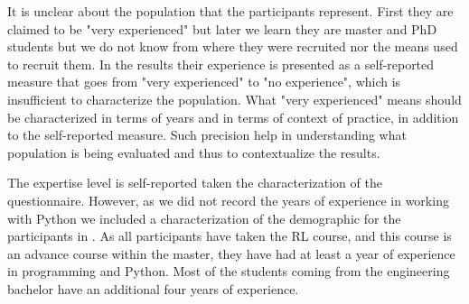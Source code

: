\begin{remark} \label{rem:characterization}
It is unclear about the population that the participants represent. First they are claimed to be "very experienced" but later we learn they are master and PhD students but we do not know from where they were recruited nor the means used to recruit them. In the results their experience is presented as a self-reported measure that goes from "very experienced" to "no experience", which is insufficient to characterize the population. What "very experienced" means should be characterized in terms of years and in terms of context of practice, in addition to the self-reported measure. Such precision help in understanding what population is being evaluated and thus to contextualize the results.
\end{remark}
\begin{solved}
The expertise level is self-reported taken the characterization of the questionnaire. However, as we did not record the years of experience in working with Python we included a characterization of the  demographic for the participants in . As all participants have taken the \ac{RL} course, and this course is an advance course within the master, they have had at least a year of experience in programming and Python. Most of the students coming from the engineering bachelor have an additional four years of experience.
\end{solved}

